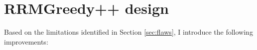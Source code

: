 \section{RRMGreedy++ design}
\label{chap:research:sec:rrmv2}

Based on the limitations identified in Section \ref{sec:flaws}, I introduce the following improvements:


